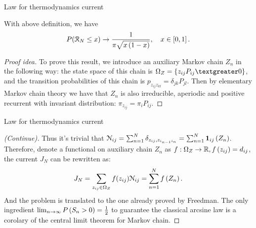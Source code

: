 \documentclass{beamer}
\begin{document}
\begin{frame}{Law for thermodynamics current}
\begin{Thm}
    With above definition, we have
    \begin{equation}
P(\mathcal{R}_N \leq x) \rightarrow  \frac{1}{\pi\sqrt{x\left( 1 - x \right)}}, \quad x \in \left[ 0, 1 \right].
\end{equation}
\end{Thm}
\begin{proof}[Proof idea]\renewcommand{\qedsymbol}{}
    To prove this result, we introduce an auxiliary Markov chain $Z_n$ in the following way: the state space of this chain is $\Omega_Z=\{z_{ij}P_{ij} \textgreater 0\}$, and the transition probabilities of this chain is $p_{z_{ij}z_{kl}}=\delta_{jk}P_{jl}$. Then by elementary Markov chain theory we have that $Z_n$ is also irreducible, aperiodic and positive recurrent with invariant distribution: $\pi_{z_{ij}}=\pi_i P_{ij}$.
\end{proof}
\end{frame}


\begin{frame}{Law for thermodynamics current}
\begin{proof}[(Continue)]
Thus it's trivial that $\mathcal{N}_{ij} = \sum_{n=1}^N \delta_{z_{ij},z_{i_{n-1}i_n}} = \sum_{n=1}^N \mathbf{1}_{ij}\left( Z_n \right)$. Therefore, denote a functional on auxiliary chain $Z_n$ as $f: \Omega_Z \rightarrow \mathbb{R}, f\left( z_{ij} \right) = d_{ij}$, the current $J_N$ can be rewritten as:
\begin{equation}\label{current-2}
J_N = \sum_{z_{ij} \in \Omega_Z}f(z_{ij})\mathcal{N}_{ij} = \sum_{n = 1}^N f\left( Z_n \right).
\end{equation}
And the problem is translated to the one already proved by Freedman. The only ingredient $\lim_{n \rightarrow \infty}P\left( S_n > 0 \right) = \frac{1}{2}$ to guarantee the classical arcsine law is a corolary of the central limit theorem for Markov chain\footnotemark.
\end{proof}
\end{frame}
\end{document}
